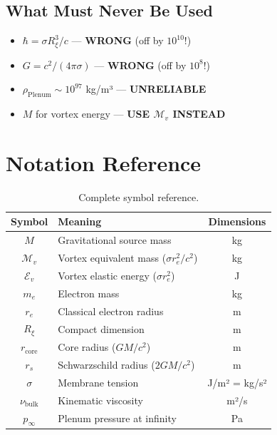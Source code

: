 \documentclass[12pt,a4paper,openany]{book}
\theoremstyle{definition}
\theoremstyle{plain}
\theoremstyle{remark}
\newcommand{\Mv}{\mathcal{M}_v}           %
\newcommand{\Ev}{\mathcal{E}_v}           %
\newcommand{\re}{r_e}                      %
\newcommand{\Rxi}{R_\xi}                   %
\newcommand{\rcore}{r_{\text{core}}}       %
\newcommand{\nubulk}{\nu_{\text{bulk}}}    %
\newcommand{\pinfty}{p_\infty}             %
\newcommand{\rs}{r_s}                      %
\begin{document}
\section{What Must Never Be Used}

\begin{warningbox}
\begin{itemize}
    \item $\hbar = \sigma \Rxi^3/c$ — \textbf{WRONG} (off by $10^{10}$!)
    \item $G = c^2/(4\pi\sigma)$ — \textbf{WRONG} (off by $10^8$!)
    \item $\rho_{\text{Plenum}} \sim 10^{97}$ kg/m³ — \textbf{UNRELIABLE}
    \item $M$ for vortex energy — \textbf{USE $\Mv$ INSTEAD}
\end{itemize}
\end{warningbox}

\appendix

\chapter{Notation Reference}

\begin{table}[H]
\centering
\begin{tabular}{|c|l|c|}
\hline
\textbf{Symbol} & \textbf{Meaning} & \textbf{Dimensions} \\
\hline
$M$ & Gravitational source mass & kg \\
$\Mv$ & Vortex equivalent mass ($\sigma\re^2/c^2$) & kg \\
$\Ev$ & Vortex elastic energy ($\sigma\re^2$) & J \\
$m_e$ & Electron mass & kg \\
$\re$ & Classical electron radius & m \\
$\Rxi$ & Compact dimension & m \\
$\rcore$ & Core radius ($GM/c^2$) & m \\
$\rs$ & Schwarzschild radius ($2GM/c^2$) & m \\
$\sigma$ & Membrane tension & J/m² = kg/s² \\
$\nubulk$ & Kinematic viscosity & m²/s \\
$\pinfty$ & Plenum pressure at infinity & Pa \\
\hline
\end{tabular}
\caption{Complete symbol reference.}
\end{table}
\end{document}
